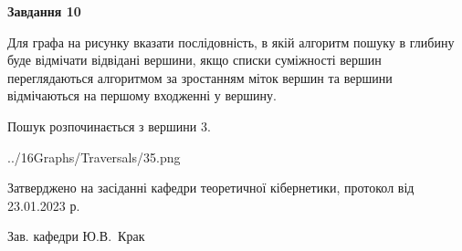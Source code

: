\documentclass[12pt, ukrainian]{article}
\begin{document}
{\begin {large}
{\begin {center}\textbf{Завдання 10}\end {center}}\par
Для графа на рисунку вказати послідовність, в якій алгоритм пошуку в глибину буде відмічати відвідані вершини, якщо списки суміжності вершин переглядаються алгоритмом за зростанням міток вершин та вершини відмічаються на першому вход\-женні у вершину.\par
Пошук розпочинається з вершини 3.\par

\begin{center}
	{../16Graphs/Traversals/35.png}
\end{center}\par
\newpage


\end {large}
}
{\smallskip \begin {small} Затверджено на засіданні кафедри теоретичної кібернетики, протокол  від   23.01.2023 р.\par\smallskip\smallskip
{\parbox {6.5 cm}{Зав. кафедри \dotfill Ю.В.~Крак}} \end{small}}
\end{document}
